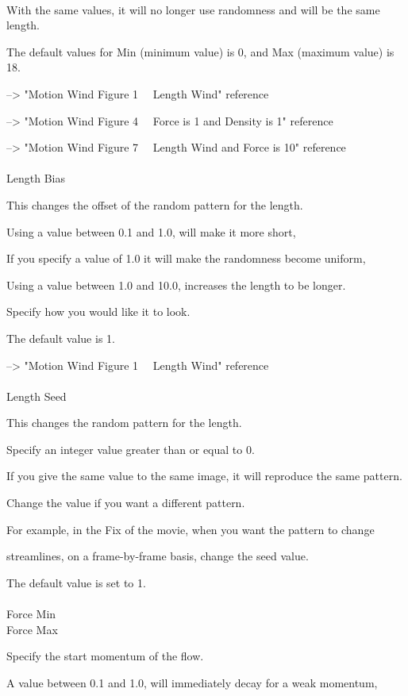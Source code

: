 \documentclass[a4paper,12pt]{article}
\begin{document}
\ \vspace{-0.2em}
\par
With the same values, it will no longer use randomness and will be the same length.\par
The default values for Min (minimum value) is 0, and Max (maximum value) is 18.\par
--> "Motion Wind Figure 1 \ \ Length Wind" reference\par
--> "Motion Wind Figure 4 \ \ Force is 1 and Density is 1" reference\par
--> "Motion Wind Figure 7 \ \ Length Wind and Force is 10" reference\\
\\
Length Bias\par
This changes the offset of the random pattern for the length.\par
Using a value between 0.1 and 1.0, will make it more short,\par
If you specify a value of 1.0 it will make the randomness become uniform,\par
Using a value between 1.0 and 10.0, increases the length to be longer.\par
Specify how you would like it to look.\par
The default value is 1.\par
--> "Motion Wind Figure 1 \ \ Length Wind" reference\\
\\
Length Seed\par
This changes the random pattern for the length.\par
Specify an integer value greater than or equal to 0.\par
If you give the same value to the same image, it will reproduce the same pattern.\par
Change the value if you want a different pattern.\par
For example, in the Fix of the movie, when you want the pattern to change\par
streamlines, on a frame-by-frame basis, change the seed value.\par
The default value is set to 1.\\
\\
Force Min\\
Force Max\par
Specify the start momentum of the flow.\par
A value between 0.1 and 1.0, will immediately decay for a weak momentum,\par
\end{document}
